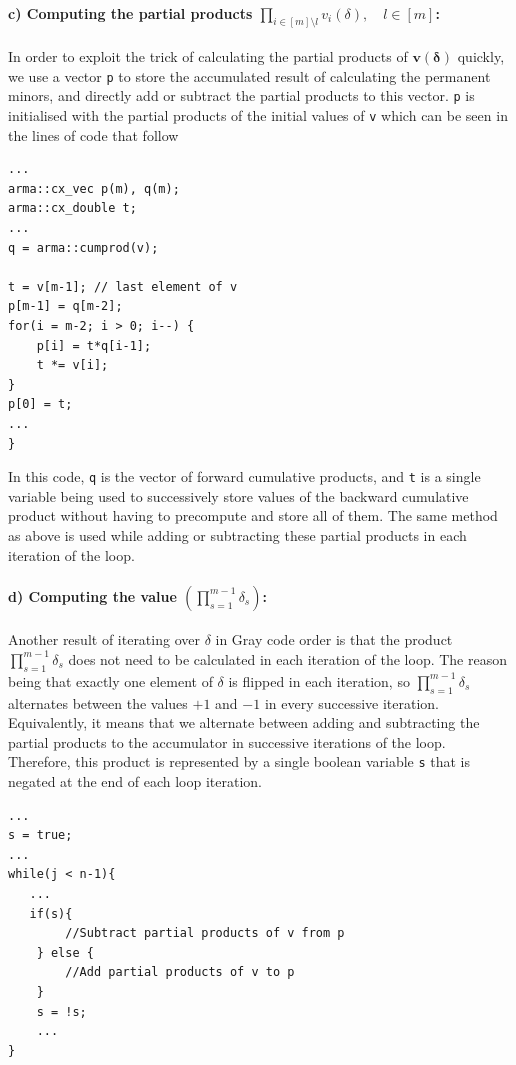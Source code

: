 \documentclass[ %
                    author={Manan Vaswani},
                supervisor={Dr. Raphael Clifford},
                    degree={MEng},
                     title={A multi-core CPU implementation of the classical Boson Sampling algorithm},
                  subtitle={},
                      type={},
                      year={2019} ]{dissertation}
\theoremstyle{plain}
\theoremstyle{definition}
\begin{document}
\paragraph{c) Computing the partial products $\prod_{i \in [m] \setminus l} v_i (\delta), \quad l \in [m]$:} In order to exploit the trick of calculating the partial products of $\mathbf{v}(\mathbf{\delta})$ quickly, we use a vector \texttt{p} to store the accumulated result of calculating the permanent minors, and directly add or subtract the partial products to this vector. \texttt{p} is initialised with the partial products of the initial values of \texttt{v} which can be seen in the lines of code that follow
\begin{verbatim}
...
arma::cx_vec p(m), q(m);
arma::cx_double t;
...
q = arma::cumprod(v);

t = v[m-1];	// last element of v
p[m-1] = q[m-2];
for(i = m-2; i > 0; i--) {
    p[i] = t*q[i-1];
    t *= v[i];
}
p[0] = t;
...
}
\end{verbatim}
In this code, \texttt{q} is the vector of forward cumulative products, and  \texttt{t} is a single variable being used to successively store values of the backward cumulative product without having to precompute and store all of them. The same method as above is used while adding or subtracting these partial products in each iteration of the loop.

\paragraph{d) Computing the value $\left( \prod_{s=1}^{m-1} \delta_s \right)$:} Another result of iterating over $\delta$ in Gray code order is that the product $\prod_{s=1}^{m-1} \delta_s$ does not need to be calculated in each iteration of the loop. The reason being that exactly one element of $\delta$ is flipped in each iteration, so $\prod_{s=1}^{m-1} \delta_s$ alternates between the values $+1$ and $-1$ in every successive iteration. Equivalently, it means that we alternate between adding and subtracting the partial products to the accumulator in successive iterations of the loop. Therefore, this product is represented by a single boolean variable \texttt{s} that is negated at the end of each loop iteration. %
\begin{verbatim}
...
s = true;
...
while(j < n-1){
   ...
   if(s){
        //Subtract partial products of v from p
    } else {
        //Add partial products of v to p
    }
    s = !s;
    ...
}
\end{verbatim}
\end{document}
